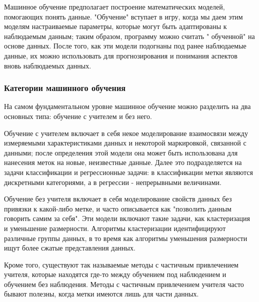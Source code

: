 Машинное обучение предполагает построение математических моделей, помогающих понять данные. "Обучение" вступает в игру, когда мы даем этим моделям настраиваемые параметры, которые могут быть адаптированы к наблюдаемым данным; таким образом, программу можно считать " обученной" на основе данных. После того, как эти модели подогнаны под ранее наблюдаемые данные, их можно использовать для прогнозирования и понимания аспектов вновь наблюдаемых данных.

\subsubsection{Категории машинного обучения}\label{ml}
На самом фундаментальном уровне машинное обучение можно разделить на два основных типа: обучение с учителем и без него.


Обучение с учителем включает в себя некое моделирование взаимосвязи между измеряемыми характеристиками данных и некоторой маркировкой, связанной с данными; после определения этой модели она может быть использована для нанесения меток на новые, неизвестные данные. Далее это подразделяется на задачи классификации и регрессионные задачи: в классификации метки являются дискретными категориями, а в регрессии - непрерывными величинами. 


Обучение без учителя включает в себя моделирование свойств данных без привязки к какой-либо метке, и часто описывается как "позволить данным говорить самим за себя". Эти модели включают такие задачи, как кластеризация и уменьшение размерности. Алгоритмы кластеризации идентифицируют различные группы данных, в то время как алгоритмы уменьшения размерности ищут более сжатые представления данных.


Кроме того, существуют так называемые методы с частичным привлечением учителя, которые находятся где-то между обучением под наблюдением и обучением без наблюдения. Методы с частичным привлечением учителя часто бывают полезны, когда метки имеются лишь для части данных.









